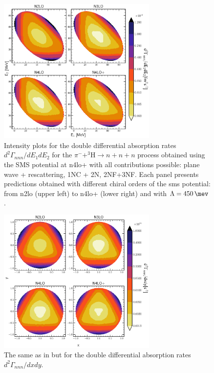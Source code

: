    \begin{figure}[h]
        \begin{center}
        \includegraphics[width=0.7\textwidth]{PlotData/PION/Dalitz_maps/figures/Dalitz_map_nnn_E1E2_orders.pdf}
        \end{center}
        \caption{Intensity plots for the double differential absorption rates
        $d^2 \Gamma_{nnn}/dE_1dE_2$ for the $\pi^- + ^3\text{H} \rightarrow n + n + n$
        process obtained using the SMS potential at \gls{n4lo+}
        with all contributions possible: plane wave + rescattering, 1NC + 2N, 2NF+3NF.
        Each panel presents predictions obtained with different chiral orders of the \gls{sms} potential:
        from \gls{n2lo} (upper left) to \gls{n4lo+} (lower right) and with $\Lambda = \SI{450}{\mev}$.}
        \label{pion_nnn_E1E2_order}
    \end{figure}


    \begin{figure}[h]
        \begin{center}
        \includegraphics[width=0.7\textwidth]{PlotData/PION/Dalitz_maps/figures/Dalitz_map_nnn_xy_orders.pdf}
        \end{center}
        \caption{The same as in  but for the double differential absorption rates
        $d^2 \Gamma_{nnn}/dxdy$.}
        \label{pion_nnn_xy_order}
    \end{figure}


